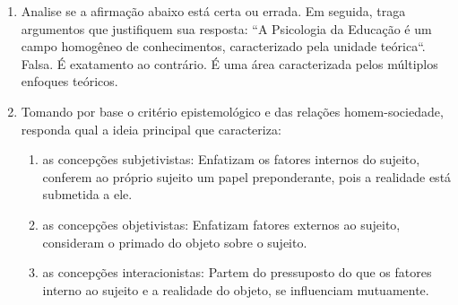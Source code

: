 \documentclass[a4paper, 12pt]{article}
\begin{document}
\begin{enumerate}
  
\item Analise se a afirmação abaixo está certa ou errada. Em seguida, traga argumentos que justifiquem sua resposta: \newline
  ``A Psicologia da Educação é um campo homogêneo de conhecimentos, caracterizado pela unidade teórica``. \\ \newline
  Falsa. É exatamento ao contrário. É uma área caracterizada pelos múltiplos enfoques teóricos.
  
\item Tomando por base o critério epistemológico e das relações homem-sociedade, responda qual a ideia principal que caracteriza:
 \begin{enumerate}
 \item as concepções subjetivistas: Enfatizam os fatores internos do sujeito, conferem ao próprio sujeito um papel preponderante, pois a realidade está submetida a ele.
 \item as concepções objetivistas: Enfatizam fatores externos ao sujeito, consideram o primado do objeto sobre o sujeito.
 \item as concepções interacionistas: Partem do pressuposto do que os fatores interno ao sujeito e a realidade do objeto, se influenciam mutuamente.
 \end{enumerate} 
 \end{enumerate}
\end{document}
